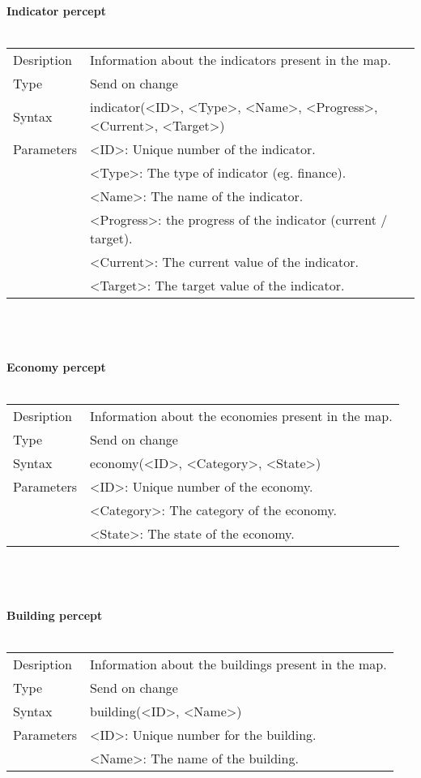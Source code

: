 \documentclass[english,11pt]{report}
\begin{document}
\textbf{Indicator percept}\\
\\
\begin{tabularx}{\textwidth}{lX}
 Desription & Information about the indicators present in the map. \\
 Type & Send on change \\
 Syntax & indicator(<ID>, <Type>, <Name>, <Progress>, <Current>, <Target>) \\
 Parameters &   <ID>: Unique number of the indicator.\\
            &   <Type>: The type of indicator (eg. finance).\\
            &   <Name>: The name of the indicator.\\
            &   <Progress>: the progress of the indicator (current / target).\\
            &   <Current>: The current value of the indicator.\\
            &   <Target>: The target value of the indicator.
\end{tabularx}\\
\\
\\
\textbf{Economy percept}\\
\\
\begin{tabularx}{\textwidth}{lX}
 Desription & Information about the economies present in the map. \\
 Type & Send on change \\
 Syntax & economy(<ID>, <Category>, <State>) \\
 Parameters &   <ID>: Unique number of the economy.\\
            &   <Category>: The category of the economy.\\
            &   <State>: The state of the economy.
\end{tabularx}\\
\\
\\
\textbf{Building percept}\\
\\
\begin{tabularx}{\textwidth}{lX}
 Desription & Information about the buildings present in the map. \\
 Type & Send on change \\
 Syntax & building(<ID>, <Name>) \\
 Parameters &   <ID>: Unique number for the building.\\
            &   <Name>: The name of the building.
\end{tabularx}
\end{document}
